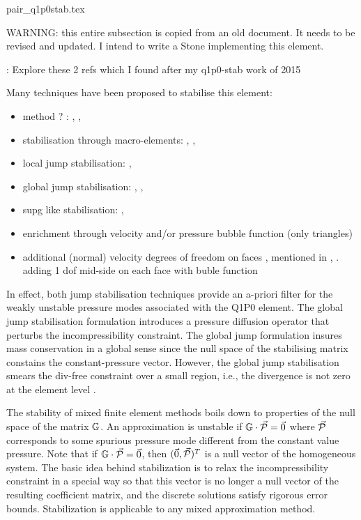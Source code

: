 \begin{flushright} {\tiny {\color{gray} pair\_q1p0stab.tex}} \end{flushright}


WARNING: this entire subsection is copied from an old document. It needs to be revised and 
updated. I intend to write a Stone implementing this element.


\Literature: Explore these 2 refs which I found after my q1p0-stab work of 2015 \cite{chke20,eguc03}


Many techniques have been proposed to stabilise this element:

\begin{itemize}
\item method ? : \cite{bbgs04},  \cite{bodg06} , \cite{bogl07}
\item stabilisation through macro-elements: \cite{fobo90}, \cite{leru86}, \cite{leta81}
\item local jump stabilisation: \cite{sike90}, \cite{kesi92,vibo92,qizh07,chri02,chco01,lisi12,lica06}
\item global jump stabilisation: \cite{hufr87}, \cite{nosi98}, \cite{dowa89} \cite{chco01}
\item supg like stabilisation: \cite{teos00}, \cite{tezd92,hufb86}
\item enrichment through velocity and/or pressure bubble function \cite{frol03}(only triangles)
\item additional (normal) velocity degrees of freedom on faces \cite{fofo85}, 
mentioned in \cite{sofo87}, \cite{fort81}.
adding 1 dof mid-side on each face with buble function \cite{rota87}
\end{itemize}


In effect, both jump stabilisation techniques provide an a-priori filter for the weakly unstable pressure modes associated 
with the Q1P0 element. The global jump stabilisation formulation introduces a pressure diffusion operator
that perturbs the incompressibility constraint. The global jump formulation insures mass conservation in a global  
sense since the null space of the stabilising matrix constains the constant-pressure vector. However, the global 
jump stabilisation smears the div-free constraint over a small region, i.e., the divergence is not 
zero at the element level \cite{chri}.


The stability of mixed finite element methods boils down to properties of the null space of the matrix ${\mathbb{G}}$. 
An approximation is unstable if ${\mathbb{G}} \cdot \vec{\cal P} = \vec{0}$ where $\vec{\cal P}$ 
corresponds to some spurious pressure mode different from the constant value pressure.  
Note that if ${\mathbb{G}}\cdot \vec{\cal P} = \vec{0}$, then $(\vec{0},\vec{\cal P})^T$ is a null vector of 
the homogeneous system. 
The basic idea behind stabilization is to relax the incompressibility constraint in a special way so that 
this vector is no longer a null vector of the resulting coefficient matrix, and 
the discrete solutions satisfy rigorous error bounds. 
Stabilization is applicable to any mixed approximation method. 

